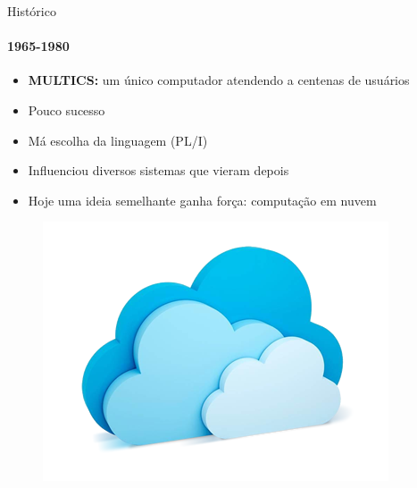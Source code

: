 \documentclass{beamer}
\begin{document}
\begin{frame}{Histórico}
	\framesubtitle{1965-1980}
	\begin{itemize}
		\item \textbf{MULTICS:} um único computador atendendo a centenas de usuários
		\item Pouco sucesso
		\item Má escolha da linguagem (PL/I)
		\item Influenciou diversos sistemas que vieram depois
		\item Hoje uma ideia semelhante ganha força: \alert{computação em nuvem}
	\end{itemize}
	\begin{figure}
		\includegraphics[width=0.4\paperwidth]{resources/cloud}
	\end{figure}
\end{frame}
\end{document}

